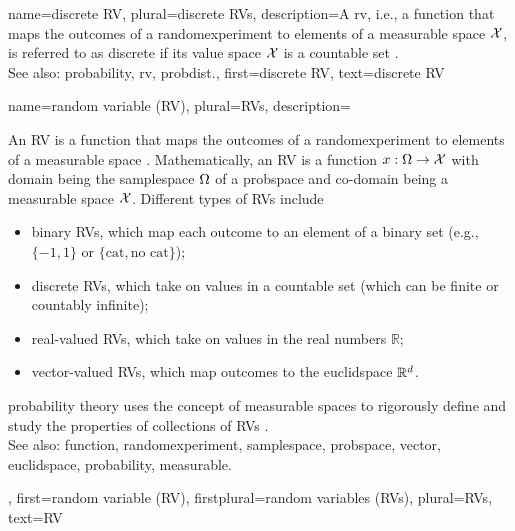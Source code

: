 {name={discrete RV}, 
  plural={discrete RVs},
 	description={A \gls{rv}, i.e., a \gls{function} that maps the 
		outcomes of a \gls{randomexperiment} to elements of a \gls{measurable} space $\mathcal{X}$, 
		is referred to as discrete if its value space $\mathcal{X}$ is a countable set \cite{BillingsleyProbMeasure}. 
			\\
		See also: \gls{probability}, \gls{rv}, \gls{probdist}.},
 	first={discrete RV},
 	text={discrete RV}  
}



{name={random variable (RV)}, plural={RVs},
 	description={An RV is a \gls{function} that maps the 
		outcomes of a \gls{randomexperiment} to elements of a \gls{measurable} space 
		\cite{BillingsleyProbMeasure,GrayProbBook}. 
 		Mathematically, an RV is a \gls{function} $x: \Omega \rightarrow \mathcal{X}$ 
		with domain being the \gls{samplespace} $\Omega$ of a \gls{probspace} and 
		co-domain being a \gls{measurable} space $\mathcal{X}$. 
 		Different types of RVs include  
 		\begin{itemize} 
 			\item {binary RVs}, which map each outcome to an element of a binary 
			set (e.g., $\{-1,1\}$ or $\{\text{cat}, \text{no cat}\}$); 
			\item {discrete RVs}, which take on values in a countable set (which can 
			be finite or countably infinite); 
 			\item {real-valued RVs}, which take on values in the real numbers $\mathbb{R}$;  
 			\item {\gls{vector}-valued RVs}, which map outcomes to the \gls{euclidspace} $\mathbb{R}^{d}$.  
 		\end{itemize} 
 		\Gls{probability} theory uses the concept of \gls{measurable} spaces to rigorously define 
 		and study the properties of collections of RVs \cite{BillingsleyProbMeasure}.
			\\
		See also: \gls{function}, \gls{randomexperiment}, \gls{samplespace}, \gls{probspace}, \gls{vector}, \gls{euclidspace}, \gls{probability}, \gls{measurable}.}, 
	first={random variable (RV)},
	firstplural={random variables (RVs)},
	plural={RVs},
	text={RV}  
}
 
